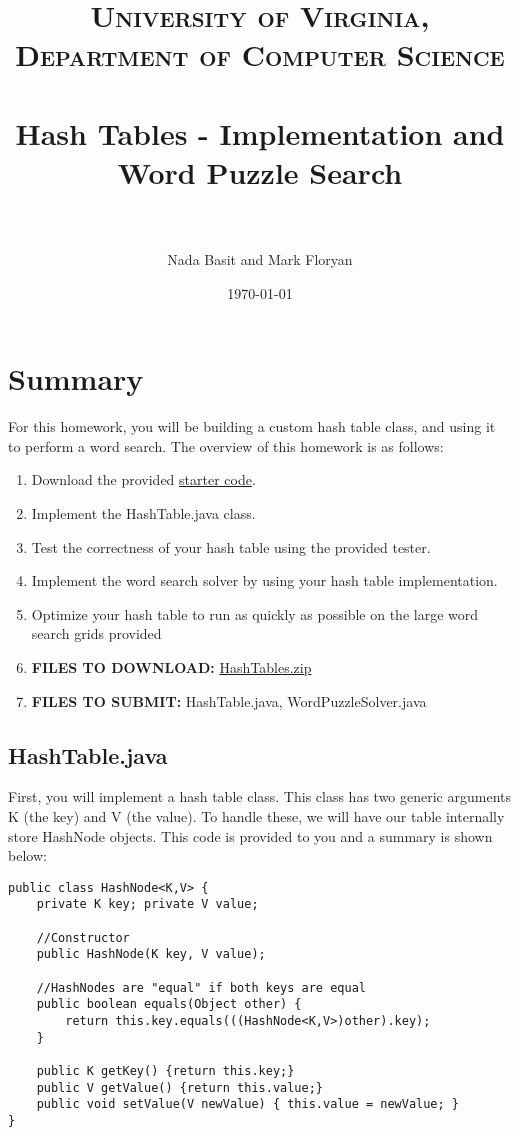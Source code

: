 \documentclass[paper=a4, fontsize=11pt, parskip=full]{scrartcl} %
\title{
\normalfont \normalsize
\textsc{University of Virginia, Department of Computer Science} \\ [25pt] %
\horrule{0.5pt} \\[0.4cm] %
\huge Hash Tables - Implementation and Word Puzzle Search \\ %
\horrule{2pt} \\[0.5cm] %
}
\author{Nada Basit and Mark Floryan}
\date{\normalsize\today} %
\numberwithin{equation}{section} %
\numberwithin{figure}{section} %
\numberwithin{table}{section} %
\begin{document}
\maketitle %


\section{Summary}

For this homework, you will be building a custom hash table class, and using it to perform a word search. The overview of this homework is as follows:

\begin{enumerate}
	\item Download the provided \href{https://uva-cs.github.io/dsa1/homeworks/HashTables/code/HashTables.zip}{starter code}.
	\item Implement the HashTable.java class.
	\item Test the correctness of your hash table using the provided tester.
	\item Implement the word search solver by using your hash table implementation.
	\item Optimize your hash table to run as quickly as possible on the large word search grids provided
	\item \textbf{FILES TO DOWNLOAD:} \href{https://uva-cs.github.io/dsa1/homeworks/HashTables/code/HashTables.zip}{HashTables.zip}
	\item \textbf{FILES TO SUBMIT:} HashTable.java, WordPuzzleSolver.java
\end{enumerate}


\subsection{HashTable.java}

First, you will implement a hash table class. This class has two generic arguments K (the key) and V (the value). To handle these, we will have our table internally store HashNode objects. This code is provided to you and a summary is shown below:

\begin{lstlisting}
public class HashNode<K,V> {
	private K key; private V value;
	
	//Constructor
	public HashNode(K key, V value);
	
	//HashNodes are "equal" if both keys are equal
	public boolean equals(Object other) {
		return this.key.equals(((HashNode<K,V>)other).key);
	}
	
	public K getKey() {return this.key;}
	public V getValue() {return this.value;}
	public void setValue(V newValue) { this.value = newValue; }
}
\end{lstlisting}
\end{document}
